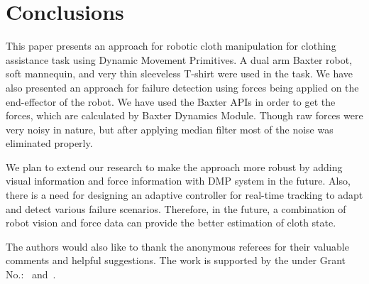 \documentclass[sigconf]{acmart}
\begin{document}
\section{Conclusions}
\label{sec:conclusions}
This paper presents an approach for robotic cloth manipulation for clothing assistance task using Dynamic Movement Primitives. A dual arm Baxter robot, soft mannequin, and very thin sleeveless T-shirt were used in the task. We have also presented an approach for failure detection using forces being applied on the end-effector of the robot. We have used the Baxter APIs in order to get the forces, which are calculated by Baxter Dynamics Module. Though raw forces were very noisy in nature, but after applying median filter most of the noise was eliminated properly.

We plan to extend our research to make the approach more robust by adding visual information and force information with DMP system in the future. Also, there is a need for designing an adaptive controller for real-time tracking to adapt and detect various failure scenarios. Therefore, in the future, a combination of robot vision and force data can provide the better estimation of cloth state.

\begin{acks}
	The authors would also like to thank the anonymous referees for their valuable comments and helpful suggestions. The work is supported by the  under Grant No.:~ and~.
\end{acks}


%

\end{document}
